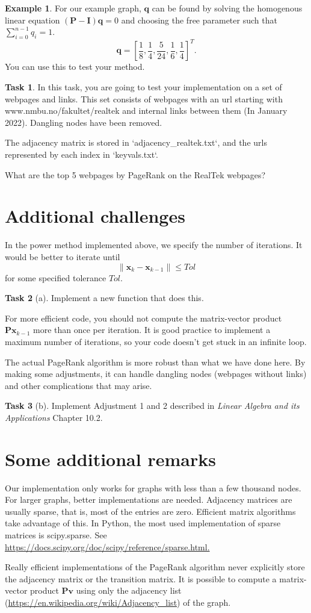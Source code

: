 \documentclass[a4paper]{scrartcl}
\theoremstyle{definition}
\newtheorem*{example}{Example}
\newtheorem{task}{Task}
\newcommand*{\mat}[1]{\mathbf{#1}}
\renewcommand*{\vec}[1]{\mathbf{#1}}
\begin{document}
\begin{example}
For our example graph, $\vec{q}$ can be found by solving the homogenous linear equation $\left(\mat{P}-\mat{I}\right)\vec{q}=0$ and choosing the free parameter such that $\sum_{i=0}^{n-1}q_i=1$.
\[
\vec{q} = \left[\frac{1}{8}, \frac{1}{4}, \frac{5}{24}, \frac{1}{6}, \frac{1}{4}\right]^T.
\]
You can use this to test your method.
\end{example}

\begin{task}
In this task, you are going to test your implementation on a set of webpages and links. This set consists of webpages with an url starting with www.nmbu.no/fakultet/realtek and internal links between them (In January 2022). Dangling nodes have been removed.

The adjacency matrix is stored in `adjacency\_realtek.txt`, and the urls represented by each index in `keyvals.txt`.

What are the top 5 webpages by PageRank on the RealTek webpages?
\end{task}

\section{Additional challenges}

In the power method implemented above, we specify the number of iterations. It would be better to iterate until 
$$\|\vec{x}_{k}-\vec{x}_{k-1}\|\le Tol$$
for some specified tolerance $Tol$.
\begin{task}[a] Implement a new function that does this.
\end{task}
For more efficient code, you should not compute the matrix-vector product $\mat{P}\vec{x}_{k-1}$ more than once per iteration.
It is good practice to implement a maximum number of iterations, so your code doesn't get stuck in an infinite loop.


\setcounter{task}{3}
The actual PageRank algorithm is more robust than what we have done here. By making some adjustments, it can handle dangling nodes (webpages without links) and other complications that may arise.
\begin{task}[b]Implement Adjustment 1 and 2 described in \emph{Linear Algebra and its Applications} Chapter 10.2.
\end{task}

\section{Some additional remarks}
Our implementation only works for graphs with less than a few thousand nodes. For larger graphs, better implementations are needed. Adjacency matrices are usually sparse, that is, most of the entries are zero. Efficient matrix algorithms take advantage of this. In Python, the most used implementation of sparse matrices is scipy.sparse. See \url{https://docs.scipy.org/doc/scipy/reference/sparse.html.}

Really efficient implementations of the PageRank algorithm never explicitly store the adjacency matrix or the transition matrix. It is possible to compute a matrix-vector product $\mathbf{P}\mathbf{v}$ using only the adjacency list (\url{https://en.wikipedia.org/wiki/Adjacency_list}) of the graph.
\end{document}
